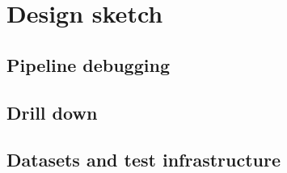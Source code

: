 \section{Design sketch}
\label{sec:design}

\subsection{Pipeline debugging}
\label{sec:design:debug}


\subsection{Drill down}
\label{sec:design:drill}


\subsection{Datasets and test infrastructure}
\label{sec:design:test}

